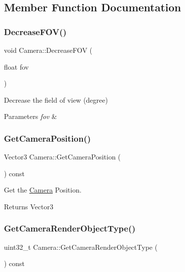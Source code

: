 \subsection{Member Function Documentation}
\mbox{\label{classCamera_a0d7a72fc6b726a97bc2babf0bb09550e}} 
\subsubsection{\texorpdfstring{Decrease\+F\+O\+V()}{DecreaseFOV()}}
{\footnotesize\ttfamily void Camera\+::\+Decrease\+F\+OV (\begin{DoxyParamCaption}\item[{float}]{fov }\end{DoxyParamCaption})}



Decrease the field of view (degree) 


\begin{DoxyParams}{Parameters}
{\em fov} & \\
\hline
\end{DoxyParams}
\mbox{\label{classCamera_a9378bf4ae942a64e0bbda67a79e57922}} 
\subsubsection{\texorpdfstring{Get\+Camera\+Position()}{GetCameraPosition()}}
{\footnotesize\ttfamily Vector3 Camera\+::\+Get\+Camera\+Position (\begin{DoxyParamCaption}{ }\end{DoxyParamCaption}) const}



Get the \hyperlink{classCamera}{Camera} Position. 

\begin{DoxyReturn}{Returns}
Vector3 
\end{DoxyReturn}
\mbox{\label{classCamera_aa2ae7a317fca3bf2278d83317251860d}} 
\subsubsection{\texorpdfstring{Get\+Camera\+Render\+Object\+Type()}{GetCameraRenderObjectType()}}
{\footnotesize\ttfamily uint32\+\_\+t Camera\+::\+Get\+Camera\+Render\+Object\+Type (\begin{DoxyParamCaption}{ }\end{DoxyParamCaption}) const}



